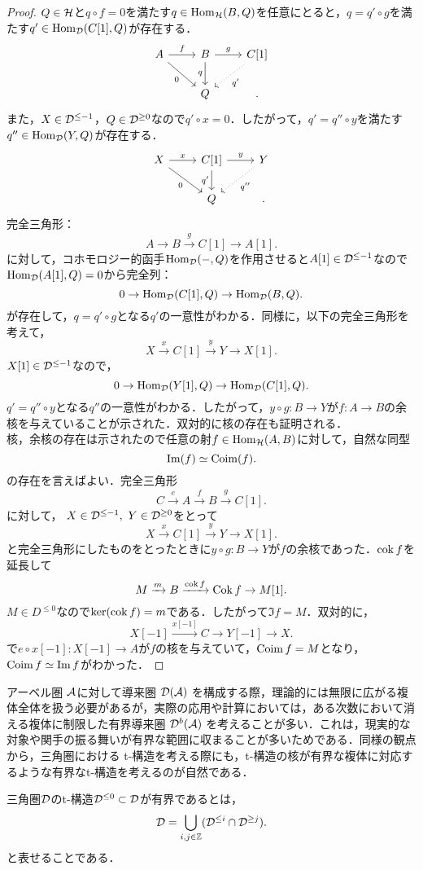 \begin{proof}
	$Q\in{\mathcal H}$と$q\circ f= 0$を満たす$q\in\operatorname{\mathrm{Hom}}_{{\mathcal H}}(B,Q)$を任意にとると，$q=q'\circ g$を満たす$q'\in\operatorname{\mathrm{Hom}}_{{\mathcal D}}(C[1],Q)$が存在する．
			\[
		\begin{tikzcd}
			A\ar[r,"f"]\ar[rd,"0",swap]&B\ar[r,"g"]\ar[d,"q",swap]& C[1]\ar[ld,"q'",dotted]\\
								 &Q &.
		\end{tikzcd}
	\]
	また，$X\in{\mathcal D}^{\le -1}$，$Q\in{\mathcal D}^{\ge 0}$なので$q'\circ x=0$．したがって，$q'=q''\circ y$を満たす$q''\in\operatorname{\mathrm{Hom}}_{{\mathcal D}}(Y,Q)$が存在する．
			\[
		\begin{tikzcd}
			X\ar[r,"x"]\ar[rd,"0",swap]& C[1]\ar[r,"y"]\ar[d,"q'",swap] & Y\ar[ld,dotted,"q''"] \\
																 &Q&.
		\end{tikzcd}
	\]
	完全三角形：
	\[A\rightarrow B\xrightarrow{g} C[1]\rightarrow A[1].\]
	に対して，コホモロジー的函手$\operatorname{\mathrm{Hom}}_{{\mathcal D}}(-,Q)$を作用させると$A[1]\in{\mathcal D}^{\le -1}$なので$\operatorname{\mathrm{Hom}}_{{\mathcal D}}(A[1],Q)=0$から完全列：
	\[0\rightarrow \operatorname{\mathrm{Hom}}_{{\mathcal D}}(C[1],Q) \rightarrow \operatorname{\mathrm{Hom}}_{{\mathcal D}}(B,Q).\]
	が存在して，$q=q'\circ g$となる$q'$の一意性がわかる．同様に，以下の完全三角形を考えて，
	\[X\xrightarrow{x} C[1]\xrightarrow{y} Y\rightarrow X[1].\]
$X[1]\in{\mathcal D}^{\le -1}$なので，
	\[0\rightarrow \operatorname{\mathrm{Hom}}_{{\mathcal D}}(Y[1],Q) \rightarrow \operatorname{\mathrm{Hom}}_{{\mathcal D}}(C[1],Q).\]
	$q'=q''\circ y$となる$q''$の一意性がわかる．したがって，$y\circ g\colon B\to Y$が$f\colon A\to B$の余核を与えていることが示された．双対的に核の存在も証明される．\\
	核，余核の存在は示されたので任意の射$f\in\operatorname{\mathrm{Hom}}_{{\mathcal H}}(A,B)$に対して，自然な同型
\[\Im(f)\simeq \operatorname{\mathrm{Coim}}(f).\]
の存在を言えばよい．完全三角形
	\[C\xrightarrow{e}A\xrightarrow{f}B\xrightarrow{g}C[1].\]
	に対して， $X\in{\mathcal D}^{\le -1},\ Y\in{\mathcal D}^{\ge 0}$をとって
	\[X\xrightarrow{x}C[1]\xrightarrow{y}Y\rightarrow X[1].\]
	と完全三角形にしたものをとったときに$y\circ g\colon B\to Y$が$f$の余核であった．$\operatorname{cok} f$を延長して
	\[M\xrightarrow{m}B\xrightarrow{\operatorname{cok} f}\operatorname{Cok} f\rightarrow M[1].\]
	$M\in D^{\le 0}$なので$\ker(\operatorname{cok} f) = m$である．したがって$\Im f= M$．双対的に，
\[X[-1]\xrightarrow{x[-1]} C \rightarrow Y[-1]\rightarrow X.\]
で$e\circ x[-1]\colon X[-1]\to A$が$f$の核を与えていて，$\operatorname{\mathrm{Coim}} f = M$となり，$\operatorname{\mathrm{Coim}} f\simeq \Im f$がわかった．
\end{proof}

アーベル圏 ${\mathcal A}$に対して導来圏 ${\mathcal D}({\mathcal A})$ を構成する際，理論的には無限に広がる複体全体を扱う必要があるが，実際の応用や計算においては，ある次数において消える複体に制限した有界導来圏 ${\mathcal D}^b({\mathcal A})$ を考えることが多い．これは，現実的な対象や関手の振る舞いが有界な範囲に収まることが多いためである．同様の観点から，三角圏における t-構造を考える際にも，t-構造の核が有界な複体に対応するような有界なt-構造を考えるのが自然である．
\begin{defn}\cite{BBD}
	三角圏${\mathcal D}$のt-構造${\mathcal D}^{\le 0}\subset {\mathcal D}$が有界であるとは，
	\[{\mathcal D} = \bigcup_{i,j\in{\mathbb Z}}({\mathcal D}^{\le i}\cap{\mathcal D}^{\ge j}).\]
	と表せることである．
\end{defn}

